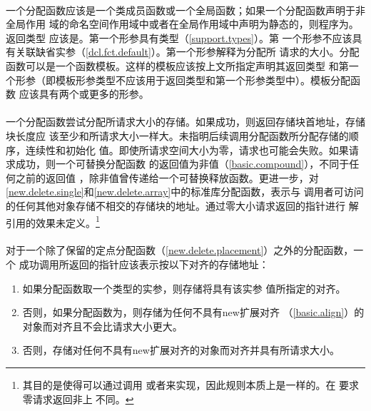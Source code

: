 \paragraph{} %
一个分配函数应该是一个类成员函数或一个全局函数；如果一个分配函数声明于非全局作用
域的命名空间作用域中或者在全局作用域中声明为静态的，则程序为\illform{}。返回类型
应该是。第一个形参具有类型（\ref{support.types}）。第
一个形参不应该具有关联缺省实参（\ref{dcl.fct.default}）。第一个形参解释为分配所
请求的大小。分配函数可以是一个函数模板。这样的模板应该按上文所指定声明其返回类型
和第一个形参（即模板形参类型不应该用于返回类型和第一个形参类型中）。模板分配函数
应该具有两个或更多的形参。

\paragraph{} %
一个分配函数尝试分配所请求大小的存储。如果成功，则返回存储块首地址，存储块长度应
该至少和所请求大小一样大。未指明后续调用分配函数所分配存储的顺序，连续性和初始化
值。即使所请求空间大小为零，请求也可能会失败。如果请求成功，则一个可替换分配函数
的返回值为非\nullp{}值（\ref{basic.compound}），不同于任何之前的返回值
，除非值曾传递给一个可替换释放函数。更进一步，对
\ref{new.delete.single}和\ref{new.delete.array}中的标准库分配函数，表示与
调用者可访问的任何其他对象存储不相交的存储块的地址。通过零大小请求返回的指针进行
解引用的效果未定义。\footnote{其目的是使得可以通过调用
或者来实现，因此规则本质上是一样的。\cpp{}在
要求零请求返回非\nullp{}上与\c{}不同。}

\paragraph{} %
对于一个除了保留的定点分配函数（\ref{new.delete.placement}）之外的分配函数，一个
成功调用所返回的指针应该表示按以下对齐的存储地址：
\begin{enumerate}
  \item 如果分配函数取一个类型的实参，则存储将具有该实参
        值所指定的对齐。
  \item 否则，如果分配函数为，则存储为任何不具有new扩展对齐
        （\ref{basic.align}）的对象而对齐且不会比请求大小更大。
  \item 否则，存储对任何不具有new扩展对齐的对象而对齐并具有所请求大小。
\end{enumerate}

